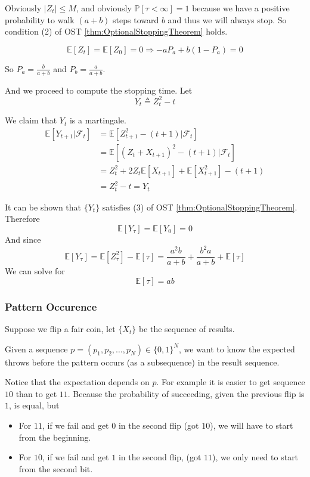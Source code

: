             Obviously $|Z_t| \le M$, and obviously $\mathbb{P}[\tau < \infty]=1$ because we have a positive probability to walk $(a+b)$ steps toward $b$ and thus we will always stop. So condition (2) of OST \ref{thm:OptionalStoppingTheorem} holds.

            \[ \mathbb{E}[Z_t] = \mathbb{E}[Z_0] = 0 \Rightarrow -aP_a + b(1-P_a) = 0 \]

            So $P_a = \frac{b}{a+b}$ and $P_b = \frac{a}{a+b}$.

            And we proceed to compute the stopping time. Let
            \[ Y_t \triangleq Z_t^2 - t \]

            We claim that $Y_t$ is a martingale.
            \begin{align*}
                \mathbb{E}[Y_{t+1}|\mathcal{F}_t] &= \mathbb{E}[Z_{t+1}^2 - (t+1)|\mathcal{F}_t]\\
                &= \mathbb{E}[(Z_t + X_{t+1})^2 - (t+1) | \mathcal{F}_t]\\
                &= Z_t^2 + 2Z_t\mathbb{E}[X_{t+1}] + \mathbb{E}[X_{t+1}^2] - (t+1)\\
                &= Z_t^2 - t = Y_t
            \end{align*}

            It can be shown that $\{Y_t\}$ satisfies (3) of OST \ref{thm:OptionalStoppingTheorem}. Therefore
            \[ \mathbb{E}[Y_{\tau}] = \mathbb{E}[Y_0] = 0 \]
            And since
            \[ \mathbb{E}[Y_{\tau}] = \mathbb{E}[Z_{\tau}^2] - \mathbb{E}[\tau] = \frac{a^2b}{a+b} + \frac{b^2a}{a+b} + \mathbb{E}[\tau] \]
            We can solve for
            \[ \mathbb{E}[\tau] = ab \]

        \subsubsection{Pattern Occurence}
            Suppose we flip a fair coin, let $\{X_t\}$ be the sequence of results. 
            
            Given a sequence $p = (p_1,p_2,\dots,p_N) \in \{0,1\}^N$, we want to know the expected throws before the pattern occurs (as a subsequence) in the result sequence.

            Notice that the expectation depends on $p$. For example it is easier to get sequence $10$ than to get $11$. Because the probability of succeeding, given the previous flip is $1$, is equal, but
            \begin{itemize}
                \item For $11$, if we fail and get $0$ in the second flip (got $10$), we will have to start from the beginning.
                \item For $10$, if we fail and get $1$ in the second flip, (got $11$), we only need to start from the second bit.
            \end{itemize}

